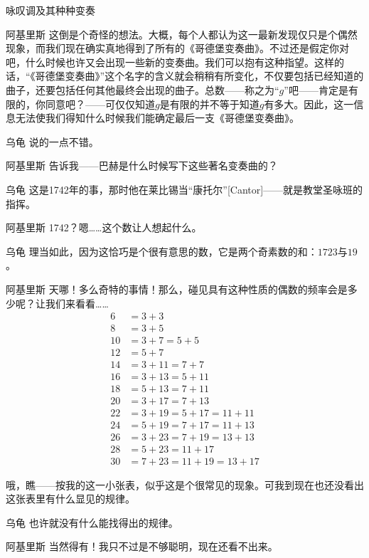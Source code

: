 \begin{dialog}{咏叹调及其种种变奏}
\begin{dialogue}
\item[阿基里斯]这倒是个奇怪的想法。大概，每个人都认为这一最新发现仅只是个偶然现象，而我们现在确实真地得到了所有的《哥德堡变奏曲》。不过还是假定你对吧，什么时候也许又会出现一些新的变奏曲。我们可以抱有这种指望。这样的话，“《哥德堡变奏曲》”这个名字的含义就会稍稍有所变化，不仅要包括已经知道的曲子，还要包括任何其他最终会出现的曲子。总数——称之为“$g$”吧——肯定是有限的，你同意吧？——可仅仅知道$g$是有限的并不等于知道$g$有多大。因此，这一信息无法使我们得知什么时候我们能确定最后一支《哥德堡变奏曲》。

\item[乌龟]说的一点不错。

\item[阿基里斯]告诉我——巴赫是什么时候写下这些著名变奏曲的？

\item[乌龟]这是1742年的事，那时他在莱比锡当“康托尔”[Cantor]——就是教堂圣咏班的指挥。

\item[阿基里斯]1742？嗯……这个数让人想起什么。

\item[乌龟]理当如此，因为这恰巧是个很有意思的数，它是两个奇素数的和：$1723$与$19$。

\item[阿基里斯]天哪！多么奇特的事情！那么，碰见具有这种性质的偶数的频率会是多少呢？让我们来看看……
\begin{align*}
   6 & =3+3 \\
   8 & =3+5 \\
  10 & =3+7=5+5 \\
  12 & =5+7 \\
  14 & =3+11=7+7 \\
  16 & =3+13=5+11 \\
  18 & =5+13=7+11 \\
  20 & =3+17=7+13 \\
  22 & =3+19=5+17=11+11 \\
  24 & =5+19=7+17=11+13 \\
  26 & =3+23=7+19=13+13 \\
  28 & =5+23=11+17 \\
  30 & =7+23=11+19=13+17
\end{align*}

哦，瞧——按我的这一小张表，似乎这是个很常见的现象。可我到现在也还没看出这张表里有什么显见的规律。

\item[乌龟]也许就没有什么能找得出的规律。

\item[阿基里斯]当然得有！我只不过是不够聪明，现在还看不出来。


\end{dialogue}
\end{dialog}
